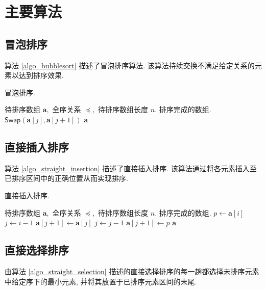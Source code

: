 \documentclass[12pt]{article}
\begin{document}
\section{主要算法}

\subsection{冒泡排序}

算法 \ref{algo_bubblesort} 描述了冒泡排序算法. 该算法持续交换不满足给定关系的元素以达到排序效果.

\begin{algorithm}[H]
\caption{冒泡排序.}
\label{algo_bubblesort}
\begin{algorithmic}[1]
\Require 待排序数组 $\bm{a},$ 全序关系 $\preceq,$ 待排序数组长度 $n.$
\Ensure 排序完成的数组.
            \State $\mathsf{Swap}(\bm{a}[j], \bm{a}[j + 1])$
        \EndIf
    \EndFor
\EndFor
\State \Return $\bm{a}$
\end{algorithmic}
\end{algorithm}

\subsection{直接插入排序}

算法 \ref{algo_straight_insertion} 描述了直接插入排序. 该算法通过将各元素插入至已排序区间中的正确位置从而实现排序.

\begin{algorithm}[H]
\caption{直接插入排序.}
\label{algo_straight_insertion}
\begin{algorithmic}[1]
\Require 待排序数组 $\bm{a},$ 全序关系 $\preceq,$ 待排序数组长度 $n.$
\Ensure 排序完成的数组.
    \State $p \gets \bm{a}[i]$
    \State $j \gets i - 1$
        \State $\bm{a}[j + 1] \gets \bm{a}[j]$
        \State $j \gets j - 1$
    \EndWhile
    \State $\bm{a}[j + 1] \gets p$
\EndFor
\State \Return $\bm{a}$
\end{algorithmic}
\end{algorithm}

\subsection{直接选择排序}

由算法 \ref{algo_straight_selection} 描述的直接选择排序的每一趟都选择未排序元素中给定序下的最小元素, 并将其放置于已排序元素区间的末尾.
\end{document}
